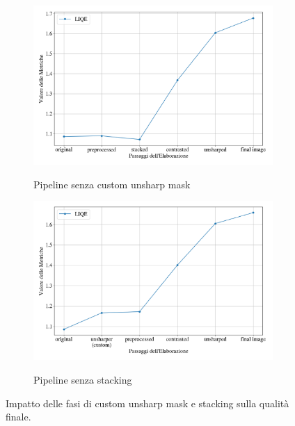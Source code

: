 \begin{figure}[H]
    \begin{subfigure}[t]{0.49\textwidth}
        \centering
        \caption{Pipeline senza custom unsharp mask}
        \includegraphics[width=\linewidth]{../assets/overall_no_ush.png}
        \label{fig:overall_no_ush}
    \end{subfigure}
    \hfill
    \begin{subfigure}[t]{0.49\textwidth}
        \centering
        \caption{Pipeline senza stacking}
        \includegraphics[width=\linewidth]{../assets/overall_no_stack.png}
        \label{fig:overall_no_stack}
    \end{subfigure}
    \caption{Impatto delle fasi di custom unsharp mask e stacking sulla qualità finale.}
    \label{fig:overall_no}
\end{figure}

\cleardoublepage
